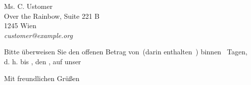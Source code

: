 \documentclass[fontsize=11pt,parskip=half]{scrlttr2}
\begin{document}
\begin{letter}{%
						Ms. C. Ustomer\\
						Over the Rainbow, Suite 221\kern 1pt B\\
						1245 Wien\\[1ex]
						\hfill\emph{customer@example.org}
	}


{\def\par{\relax\ifhmode\unskip\fi\space\ignorespaces} 

		Bitte überweisen Sie den offenen Betrag von\Total\ (darin enthalten\TaxAmnt ~\TaxAbrv) binnen \numberstringnum{\payperiod}~Tagen, d.\kern 1pt h. bis \DayName{\year}{\month}{\day+\payperiod}, den \duedate , auf unser 

		\AdvanceDate[-\payperiod]				%

}	%
\def\amount					{3787,92}		%




\renewcommand*{\raggedsignature}{\raggedright}




		\closing{Mit freundlichen Grüßen}

	\end{letter}
\end{document}
